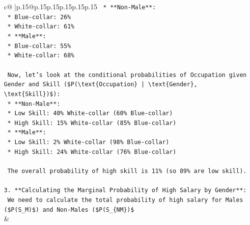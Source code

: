 \documentclass{article}
\begin{document}
{\begin{supertabular}{c@{$\;$}|p{.15\linewidth}@{}p{.15\linewidth}p{.15\linewidth}p{.15\linewidth}p{.15\linewidth}p{.15\linewidth}}
{{{\texttt{    *   **Non{-}Male**:} \\
\texttt{        *   Blue{-}collar: 26\%} \\
\texttt{        *   White{-}collar: 61\%} \\
\texttt{    *   **Male**:} \\
\texttt{        *   Blue{-}collar: 55\%} \\
\texttt{        *   White{-}collar: 68\%} \\
\\ 
\texttt{    Now, let's look at the conditional probabilities of Occupation given Gender and Skill (\$P(\textbackslash{}text\{Occupation\} | \textbackslash{}text\{Gender\}, \textbackslash{}text\{Skill\})\$):} \\
\texttt{    *   **Non{-}Male**:} \\
\texttt{        *   Low Skill: 40\% White{-}collar (60\% Blue{-}collar)} \\
\texttt{        *   High Skill: 15\% White{-}collar (85\% Blue{-}collar)} \\
\texttt{    *   **Male**:} \\
\texttt{        *   Low Skill: 2\% White{-}collar (98\% Blue{-}collar)} \\
\texttt{        *   High Skill: 24\% White{-}collar (76\% Blue{-}collar)} \\
\\ 
\texttt{    The overall probability of high skill is 11\% (so 89\% are low skill).} \\
\\ 
\texttt{3.  **Calculating the Marginal Probability of High Salary by Gender**:} \\
\texttt{    We need to calculate the total probability of high salary for Males (\$P(S\_M)\$) and Non{-}Males (\$P(S\_\{NM\})\$} \\
            }
        }
    }
    & \\ \\


\end{supertabular}}
\end{document}
